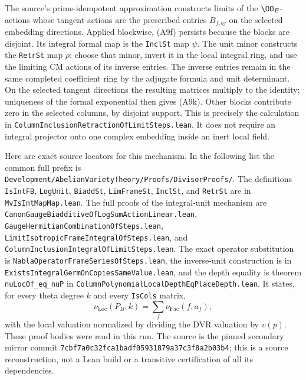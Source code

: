 The source's prime-idempotent approximation constructs
limits of the $\OO_E$-actions whose tangent actions are the
prescribed entries $B_{f,bj}$ on the selected embedding
directions.  Applied blockwise, (A9f) persists because the
blocks are disjoint.  Its integral formal map is the
\texttt{InclSt} map $\psi$.
The unit minor constructs the \texttt{RetrSt} map $\rho$:
choose that minor, invert it in the local integral ring,
and use the limiting CM actions of its inverse entries.
The inverse entries remain in the same completed coefficient
ring by the adjugate formula and unit determinant.  On the
selected tangent directions the resulting matrices multiply
to the identity; uniqueness of the formal exponential then
gives (A9k).  Other blocks contribute zero in the selected
columns, by disjoint support.  This is precisely the
calculation in
\texttt{ColumnInclusionRetractionOfLimitSteps.lean}.
It does not require an integral projector onto one complex
embedding inside an inert local field.

Here are exact source locators for this mechanism.  In the
following list the common full prefix is
\texttt{Development/AbelianVarietyTheory/Proofs/DivisorProofs/}.
The definitions \texttt{IsIntFB}, \texttt{LogUnit},
\texttt{BiaddSt}, \texttt{LimFrameSt}, \texttt{InclSt}, and
\texttt{RetrSt} are in \texttt{MvIsIntMapMap.lean}.
The full proofs of the integral-unit mechanism are
\texttt{CanonGaugeBiadditiveOfLogSumActionLinear.lean},
\texttt{GaugeHermitianCombinationOfSteps.lean},
\texttt{LimitIsotropicFrameIntegralOfSteps.lean}, and
\texttt{ColumnInclusionIntegralOfLimitSteps.lean}.
The exact operator substitution is
\texttt{NablaOperatorFrameSeriesOfSteps.lean},
the inverse-unit construction is in
\texttt{ExistsIntegralGermOnCopiesSameValue.lean}, and
the depth equality is theorem \texttt{nuLocOf\_eq\_nuP}
in \texttt{ColumnPolynomialLocalDepthEqPlaceDepth.lean}.
It states, for every theta degree $k$ and every
\texttt{IsCols} matrix,
\[
 \nu_{\mathrm{Loc}}(P_B,k)
       =\sum_f\nu_{\mathrm{Fac}}(f,a_f),
 \tag{A9o}
\]
with the local valuation normalized by dividing the DVR
valuation by $v(p)$.  These proof bodies were read in this
run.  The source is the pinned secondary mirror commit
\texttt{7cbf7a0c32fca1badf05931879a37c3f8a2b03b4};
this is a source reconstruction, not a Lean build or a
transitive certification of all its dependencies.

